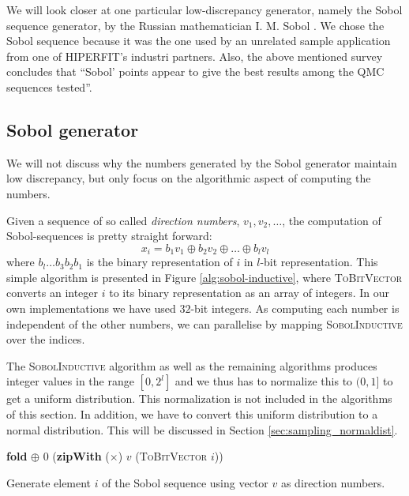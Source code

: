 We will look closer at one particular low-discrepancy generator,
namely the Sobol sequence generator, by the Russian mathematician
I. M. Sobol \cite{sobol1967}. We chose the Sobol sequence because it
was the one used by an unrelated sample application from one of
HIPERFIT's industri partners. Also, the above mentioned survey
concludes that ``Sobol' points appear to give the best results among
the QMC sequences tested''.

\subsection{Sobol generator}
\label{sec:sobol}
We will not discuss why the numbers generated by the Sobol generator
maintain low discrepancy, but only focus on the algorithmic aspect of
computing the numbers.

Given a sequence of so called \emph{direction numbers}, $v_1, v_2,
\ldots$, the computation of Sobol-sequences is pretty straight forward:
$$x_i = b_1v_1 \oplus b_2v_2 \oplus \ldots \oplus b_lv_l$$
where $b_l\ldots b_3b_2b_1$ is the binary representation of $i$ in
$l$-bit representation. This simple algorithm is presented in Figure
\ref{alg:sobol-inductive}, where \textsc{ToBitVector} converts an
integer $i$ to its binary representation as an array of integers. In
our own implementations we have used $32$-bit integers. As computing
each number is independent of the other numbers, we can parallelise by
mapping \textsc{SobolInductive} over the indices.

The \textsc{SobolInductive} algorithm as well as the remaining
algorithms produces integer values in the range $[0, 2^l]$ and we thus
has to normalize this to $(0,1]$ to get a uniform distribution. This
normalization is not included in the algorithms of this section. In
addition, we have to convert this uniform distribution to a normal
distribution. This will be discussed in Section
\ref{sec:sampling_normaldist}.

\begin{algorithm}
  \begin{algorithmic}
    \State \Return \textbf{fold} $\oplus$ 0 (\textbf{zipWith} ($\times$) $v$ (\textsc{ToBitVector} $i$))
    \EndFunction
  \end{algorithmic}
  \caption{Generate element $i$ of the Sobol sequence using vector
    $v$ as direction numbers.}
  \label{alg:sobol-inductive}
\end{algorithm}


